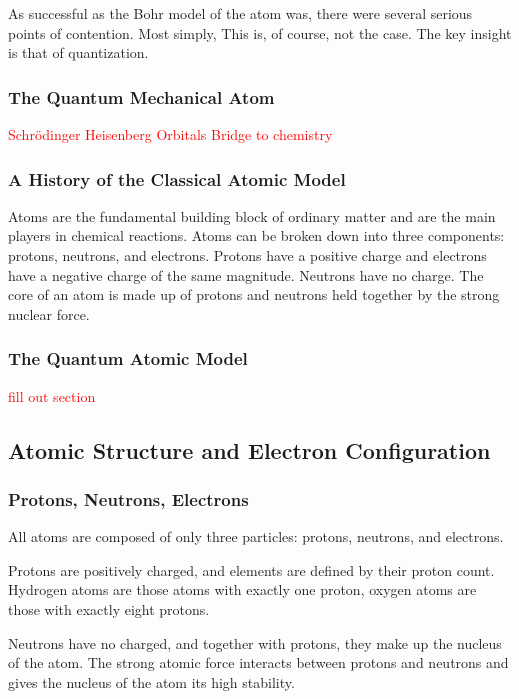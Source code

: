 As successful as the Bohr model of the atom was, there were several serious points of contention. Most simply,  This is, of course, not the case. The key insight is that of quantization.

\subsubsection{The Quantum Mechanical Atom}

\textcolor{red}{Schrödinger}
\textcolor{red}{Heisenberg}
\textcolor{red}{Orbitals}
\textcolor{red}{Bridge to chemistry}


\subsubsection{A History of the Classical Atomic Model}

Atoms are the fundamental building block of ordinary matter and are the main players in chemical reactions. Atoms can be broken down into three components: protons, neutrons, and electrons. Protons have a positive charge and electrons have a negative charge of the same magnitude. Neutrons have no charge. The core of an atom is made up of protons and neutrons held together by the strong nuclear force.







\subsubsection{The Quantum Atomic Model}
\textcolor{red}{fill out section}

\subsection{Atomic Structure and Electron Configuration}
\subsubsection{Protons, Neutrons, Electrons}

All atoms are composed of only three particles: protons, neutrons, and electrons.

Protons are positively charged, and elements are defined by their proton count. Hydrogen atoms are those atoms with exactly one proton, oxygen atoms are those with exactly eight protons.

Neutrons have no charged, and together with protons, they make up the nucleus of the atom. The strong atomic force interacts between protons and neutrons and gives the nucleus of the atom its high stability.

